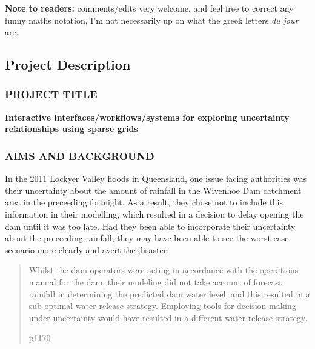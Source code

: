\documentclass[a4paper,fontsize=12pt]{scrartcl}
\author{}
\date{\today}
\begin{document}
\noindent
\textbf{Note to readers:} comments/edits very welcome, and feel free to correct any funny maths notation, I'm not
  necessarily up on what the greek letters \emph{du jour} are.

\renewcommand{\thesection}{\Alph{section}}

\setcounter{section}{3} %
\subsection{Project Description}
\label{sec:project-description}

\subsubsection*{PROJECT TITLE}

\textbf{Interactive interfaces/workflows/systems for exploring uncertainty relationships using sparse grids}


\subsubsection*{AIMS AND BACKGROUND}


In the 2011 Lockyer Valley floods in Queensland, one issue facing
authorities was their uncertainty about the amount of rainfall in the
Wivenhoe Dam catchment area in the preceeding fortnight. As a result,
they chose not to include this information in their modelling, which
resulted in a decision to delay opening the dam until it was too late.
Had they been able to incorporate their uncertainty about the
preceeding rainfall, they may have been able to see the worst-case
scenario more clearly and avert the disaster:
\blockquote[\cite{vandenhonert_2011_2011} p1170]{Whilst the dam
  operators were acting in accordance with the operations manual for
  the dam, their modeling did not take account of forecast rainfall in
  determining the predicted dam water level, and this resulted in a
  sub-optimal water release strategy. Employing tools for decision
  making under uncertainty would have resulted in a different water
  release strategy.}
\end{document}

